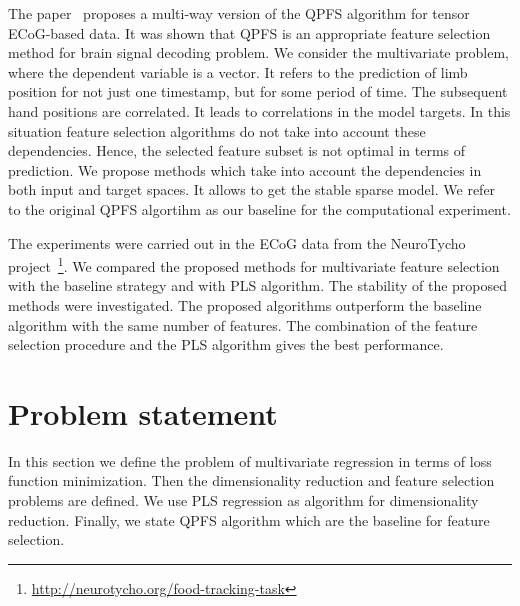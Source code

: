 \documentclass[12pt,oneside]{article}
\theoremstyle{definition}
\begin{document}
The paper~\cite{gasanov2013ecog} proposes a multi-way version of the QPFS algorithm for tensor ECoG-based data. 
It was shown that QPFS is an appropriate feature selection method for brain signal decoding problem.
We consider the multivariate problem, where the dependent variable is a vector. 
It refers to the prediction of limb position for not just one timestamp, but for some period of time. 
The subsequent hand positions are correlated. 
It leads to correlations in the model targets. 
In this situation feature selection algorithms do not take into account these dependencies.
Hence, the selected feature subset is not optimal in terms of prediction.
We propose methods which take into account the dependencies in both input and target spaces. 
It allows to get the stable sparse model.
We refer to the original QPFS algortihm as our baseline for the computational experiment.

The experiments were carried out in the ECoG data from the NeuroTycho project~\footnote{\href{http://neurotycho.org/food-tracking-task}{http://neurotycho.org/food-tracking-task}}. 
We compared the proposed methods for multivariate feature selection with the baseline strategy and with PLS algorithm. 
The stability of the proposed methods were investigated.
The proposed algorithms outperform the baseline algorithm with the same number of features. 
The combination of the feature selection procedure and the PLS algorithm gives the best performance.

\newpage
\section{Problem statement}
In this section we define the problem of multivariate regression in terms of loss function minimization. 
Then the dimensionality reduction and feature selection problems are defined. We use PLS regression as algorithm for dimensionality reduction. 
Finally, we state QPFS algorithm which are the baseline for feature selection.
\end{document}
